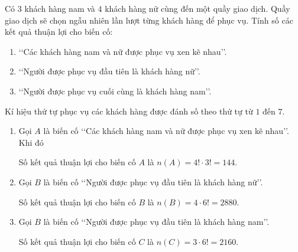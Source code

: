 \begin{bt}%
	Có $3$ khách hàng nam và $4$ khách hàng nữ cùng đến một quầy giao dịch. Quầy giao dịch sẽ chọn ngẫu nhiên lần lượt từng khách hàng để phục vụ. Tính số các kết quả thuận lợi cho biến cố:
	\begin{enumerate}
		\item \lq\lq  Các khách hàng nam và nữ được phục vụ xen kẽ nhau\rq\rq.
		\item \lq\lq  Người được phục vụ đầu tiên là khách hàng nữ\rq\rq.
		\item \lq\lq  Người được phục vụ cuối cùng là khách hàng nam\rq\rq.
	\end{enumerate}
	\loigiai
	{
		Kí hiệu thứ tự phục vụ các khách hàng được đánh số theo thứ tự từ $1$ đến $7$.
		\begin{enumerate}
			\item Gọi $A$ là biến cố \lq\lq  Các khách hàng nam và nữ được phục vụ xen kẽ nhau\rq\rq. Khi đó
			Số kết quả thuận lợi cho biến cố $A$ là $n(A)= 4! \cdot 3!= 144$.
			\item Gọi $B$ là biến cố \lq\lq  Người được phục vụ đầu tiên là khách hàng nữ\rq\rq.
			Số kết quả thuận lợi cho biến cố $B$ là $n(B)= 4\cdot 6!= 2880$.
			\item Gọi $B$ là biến cố \lq\lq  Người được phục vụ đầu tiên là khách hàng nam\rq\rq.
			Số kết quả thuận lợi cho biến cố $C$ là $n(C)= 3\cdot 6!= 2160$.
		\end{enumerate}
	}
\end{bt}
	
